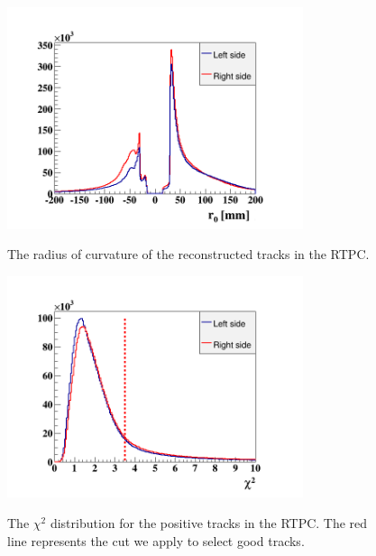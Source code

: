 \begin{itemize}
\begin{figure}[tbp]
\begin{minipage}[c]{.46\linewidth}
\hspace{-0.3in}
\includegraphics[height=6.5cm]{fig_rtpc/rtpc_r0.png}
\caption{The radius of curvature of the reconstructed tracks in the RTPC.} 
\vspace{0.4in}
\label{fig:rtpc_ro}
\end{minipage} \hfill
\begin{minipage}[c]{.46\linewidth}
\hspace{-0.3in}
\includegraphics[height=6.5cm]{fig_rtpc/rtpc_X2.png}
\caption{The $\chi^{2}$ distribution for the positive tracks in the RTPC. The red 
line represents the cut we apply to select good tracks.}
\vspace{+0.1in}
\label{fig:rrtpc_X2}
\end{minipage}
\end{figure}


\end{itemize}
